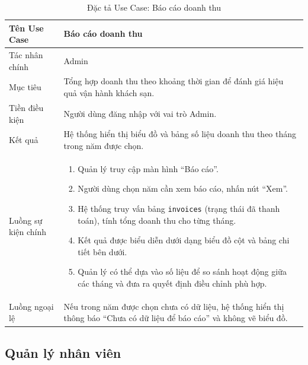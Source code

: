 \documentclass[13pt,a4paper]{extreport}
\begin{document}
\begin{table}[H]
\centering
\caption{Đặc tả Use Case: Báo cáo doanh thu}
\label{tab:uc-reports}
\begin{tabular}{p{4cm}p{10cm}}
\hline
Tên Use Case & Báo cáo doanh thu\\
\hline
Tác nhân chính & Admin\\
Mục tiêu & Tổng hợp doanh thu theo khoảng thời gian để đánh giá hiệu quả vận hành khách sạn.\\
Tiền điều kiện & Người dùng đăng nhập với vai trò Admin.\\
Kết quả & Hệ thống hiển thị biểu đồ và bảng số liệu doanh thu theo tháng trong năm được chọn.\\
\hline
Luồng sự kiện chính &
\begin{enumerate}
  \item Quản lý truy cập màn hình ``Báo cáo''.
  \item Người dùng chọn năm cần xem báo cáo, nhấn nút ``Xem''.
  \item Hệ thống truy vấn bảng \texttt{invoices} (trạng thái đã thanh toán), tính tổng doanh thu cho từng tháng.
  \item Kết quả được biểu diễn dưới dạng biểu đồ cột và bảng chi tiết bên dưới.
  \item Quản lý có thể dựa vào số liệu để so sánh hoạt động giữa các tháng và đưa ra quyết định điều chỉnh phù hợp.
\end{enumerate}\\
\hline
Luồng ngoại lệ &
Nếu trong năm được chọn chưa có dữ liệu, hệ thống hiển thị thông báo ``Chưa có dữ liệu để báo cáo'' và không vẽ biểu đồ.\\
\hline
\end{tabular}
\end{table}

\subsection*{Quản lý nhân viên}
\end{document}
